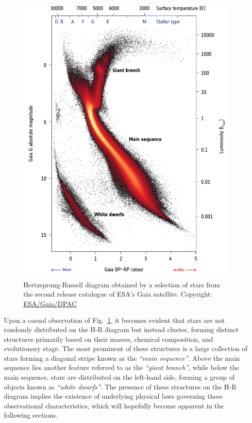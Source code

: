 \documentclass[main.tex]{subfiles}
\begin{document}
    \begin{figure}[h!]
        \centering
        \includegraphics[scale=0.25]{figures/chapter1/hrd_gaia.png}
        \caption{Hertzsprung-Russell diagram obtained by a selection of stars from the second release catalogue of ESA's Gaia satellite. Copyright: \href{https://sci.esa.int/web/gaia/-/60198-gaia-hertzsprung-russell-diagram}{ESA/Gaia/DPAC}}
        \label{fig:hrd_gaia}
    \end{figure}

    Upon a casual observation of Fig.~\ref{fig:hrd_gaia}, it becomes evident that stars are not randomly distributed on the H-R diagram but instead cluster, forming distinct structures primarily based on their masses, chemical composition, and evolutionary stage. The most prominent of these structures is a large collection of stars forming a diagonal stripe known as the \textit{``main sequence''}. Above the main sequence lies another feature referred to as the \textit{``giant branch''}, while below the main sequence, stars are distributed on the left-hand side, forming a group of objects known as \textit{``white dwarfs''}. The presence of these structures on the H-R diagram implies the existence of underlying physical laws governing these observational characteristics, which will hopefully become apparent in the following sections.
\end{document}
